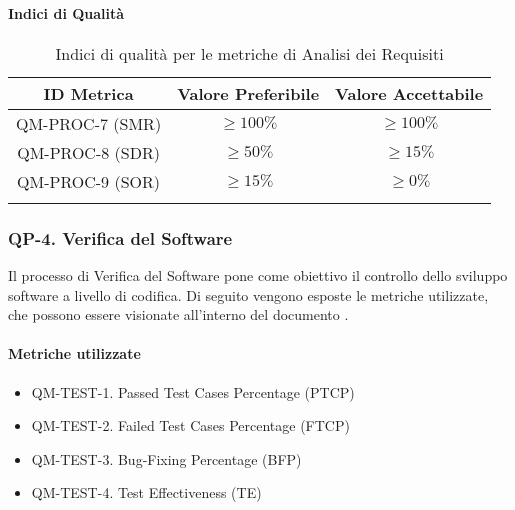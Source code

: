 		\paragraph{Indici di Qualità}

			\begin{center}
				\begin{longtable}{|c|c|c|}
				\hline
				\rowcolor{lighter-grayer}
				\textbf{ID Metrica} & \textbf{Valore Preferibile} & \textbf{Valore Accettabile}\\
				\hline
				\endfirsthead
				\hline
				QM-PROC-7 (SMR) & \(\geq 100\%\) & \(\geq 100\%\) \\
				\hline
				QM-PROC-8 (SDR) & \(\geq 50\%\) & \(\geq 15\%\) \\
				\hline
				QM-PROC-9 (SOR) & \(\geq 15\%\) & \(\geq 0\%\) \\
				\hline
				\caption{Indici di qualità per le metriche di Analisi dei Requisiti}
				\end{longtable}
			\end{center}

	\subsubsection{QP-4. Verifica del Software}

		Il processo di Verifica del Software pone come obiettivo il controllo dello sviluppo software a livello di codifica.
		Di seguito vengono esposte le metriche utilizzate, che possono essere visionate all'interno del documento . 

		\paragraph{Metriche utilizzate}

			\begin{itemize}
				\item QM-TEST-1. Passed Test Cases Percentage (PTCP)
				\item QM-TEST-2. Failed Test Cases Percentage (FTCP)
				\item QM-TEST-3. Bug-Fixing Percentage (BFP)
				\item QM-TEST-4. Test Effectiveness (TE)
			\end{itemize}


